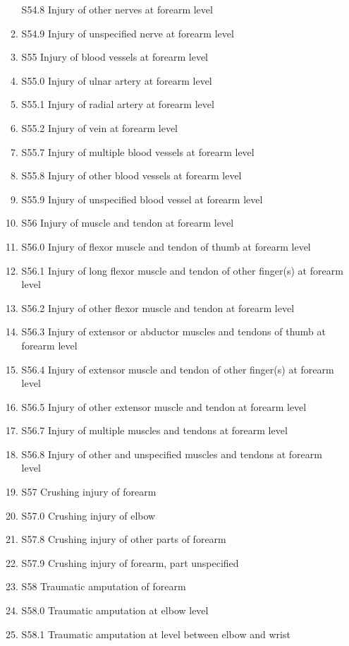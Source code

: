 \documentclass[
]{scrartcl}
\begin{document}
\begin{itemize}
\begin{enumerate}
    S54.8 Injury of other nerves at forearm level
  \item
    S54.9 Injury of unspecified nerve at forearm level
  \item
    S55 Injury of blood vessels at forearm level
  \item
    S55.0 Injury of ulnar artery at forearm level
  \item
    S55.1 Injury of radial artery at forearm level
  \item
    S55.2 Injury of vein at forearm level
  \item
    S55.7 Injury of multiple blood vessels at forearm level
  \item
    S55.8 Injury of other blood vessels at forearm level
  \item
    S55.9 Injury of unspecified blood vessel at forearm level
  \item
    S56 Injury of muscle and tendon at forearm level
  \item
    S56.0 Injury of flexor muscle and tendon of thumb at forearm level
  \item
    S56.1 Injury of long flexor muscle and tendon of other finger(s) at
    forearm level
  \item
    S56.2 Injury of other flexor muscle and tendon at forearm level
  \item
    S56.3 Injury of extensor or abductor muscles and tendons of thumb at
    forearm level
  \item
    S56.4 Injury of extensor muscle and tendon of other finger(s) at
    forearm level
  \item
    S56.5 Injury of other extensor muscle and tendon at forearm level
  \item
    S56.7 Injury of multiple muscles and tendons at forearm level
  \item
    S56.8 Injury of other and unspecified muscles and tendons at forearm
    level
  \item
    S57 Crushing injury of forearm
  \item
    S57.0 Crushing injury of elbow
  \item
    S57.8 Crushing injury of other parts of forearm
  \item
    S57.9 Crushing injury of forearm, part unspecified
  \item
    S58 Traumatic amputation of forearm
  \item
    S58.0 Traumatic amputation at elbow level
  \item
    S58.1 Traumatic amputation at level between elbow and wrist

\end{enumerate}
\end{itemize}
\end{document}
